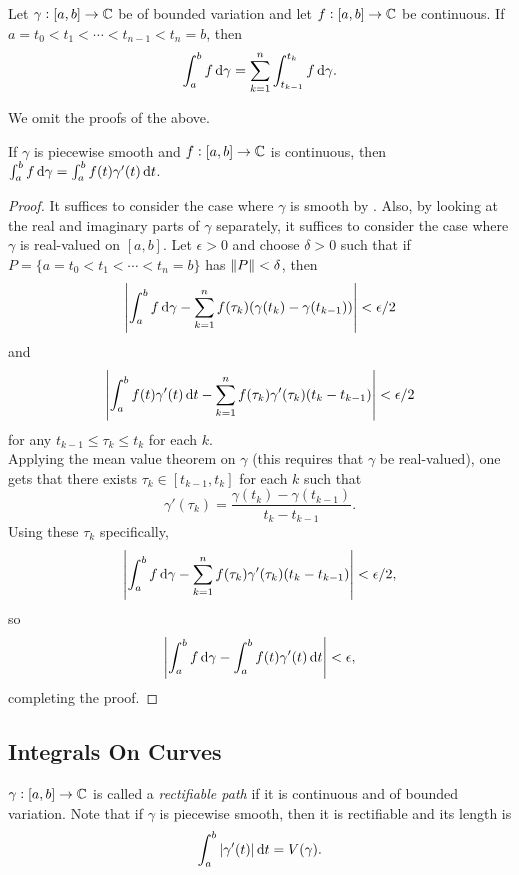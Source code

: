 		\begin{prop}
			\label{lemma: can split integral}
			Let $\gamma : [a,b] \to \mathbb{C}$ be of bounded variation and let $f : [a,b] \to \mathbb{C}$ be continuous. If $a = t_0 < t_1 < \cdots < t_{n-1} < t_n = b$, then
			\[ \int_a^b f \dif \gamma = \sum_{k=1}^n \int_{t_{k-1}}^{t_k} f \dif \gamma. \]
		\end{prop}

		We omit the proofs of the above.

		\begin{ftheo}
			If $\gamma$ is piecewise smooth and $f : [a,b] \to \mathbb{C}$ is continuous, then $\int_a^b f \dif \gamma = \int_a^b f(t) \gamma'(t) \dif t$.
		\end{ftheo}
		\begin{proof}
			It suffices to consider the case where $\gamma$ is smooth by . Also, by looking at the real and imaginary parts of $\gamma$ separately, it suffices to consider the case where $\gamma$ is real-valued on $[a,b]$. Let $\epsilon > 0$ and choose $\delta > 0$ such that if $P = \{ a = t_0 < t_1 < \cdots < t_n = b \}$ has $\left\lVert P\right\rVert < \delta$, then
			\[ \left| \int_a^b f \dif \gamma - \sum_{k=1}^n f(\tau_k) (\gamma(t_k) - \gamma(t_{k-1})) \right| < \epsilon/2 \]
			and
			\[ \left| \int_a^b f(t) \gamma'(t) \dif t - \sum_{k=1}^n f(\tau_k) \gamma'(\tau_k) (t_k - t_{k-1}) \right| < \epsilon/2 \]
			for any $t_{k-1} \le \tau_k \le t_k$ for each $k$.\\
			Applying the mean value theorem on $\gamma$ (this requires that $\gamma$ be real-valued), one gets that there exists $\tau_k \in [t_{k-1},t_k]$ for each $k$ such that
			\[ \gamma'(\tau_k) = \frac{\gamma(t_k) - \gamma(t_{k-1})}{t_k - t_{k-1}}. \]
			Using these $\tau_k$ specifically, 
			\[ \left| \int_a^b f \dif \gamma - \sum_{k=1}^n f(\tau_k) \gamma'(\tau_k) (t_k - t_{k-1}) \right| < \epsilon/2, \]
			so
			\[ \left| \int_a^b f \dif \gamma - \int_a^b f(t) \gamma'(t) \dif t \right| < \epsilon, \]
			completing the proof.
		\end{proof}

\subsection{Integrals On Curves}

	\begin{fdef}
		$\gamma:[a,b]\to\mathbb{C}$ is called a \emph{rectifiable path} if it is continuous and of bounded variation. Note that if $\gamma$ is piecewise smooth, then it is rectifiable and its length is
		\[ \int_a^b |\gamma'(t)| \dif t = V(\gamma). \]
	\end{fdef}

